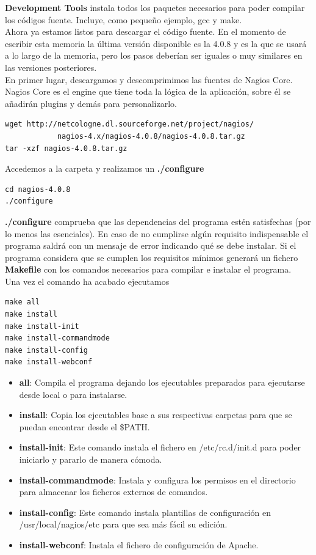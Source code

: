 \documentclass[11pt,a4paper]{article}
\begin{document}
\textbf{Development Tools} instala todos los paquetes necesarios para poder compilar los códigos fuente. Incluye, como pequeño ejemplo, gcc y make.
\\

Ahora ya estamos listos para descargar el código fuente. En el momento de escribir esta memoria la última versión disponible es la 4.0.8 y es la que se usará a lo largo de la memoria, pero los pasos deberían ser iguales o muy similares en las versiones posteriores.
\\

En primer lugar, descargamos y descomprimimos las fuentes de Nagios Core. Nagios Core es el engine que tiene toda la lógica de la aplicación, sobre él se añadirán plugins y demás para personalizarlo.

\begin{verbatim}
wget http://netcologne.dl.sourceforge.net/project/nagios/
            nagios-4.x/nagios-4.0.8/nagios-4.0.8.tar.gz
tar -xzf nagios-4.0.8.tar.gz
\end{verbatim}

Accedemos a la carpeta y realizamos un \textbf{./configure}

\begin{verbatim}
cd nagios-4.0.8
./configure
\end{verbatim}

\textbf{./configure} comprueba que las dependencias del programa estén satisfechas (por lo menos las esenciales). En caso de no cumplirse algún requisito indispensable el programa saldrá con un mensaje de error indicando qué se debe instalar. Si el programa considera que se cumplen los requisitos mínimos generará un fichero \textbf{Makefile} con los comandos necesarios para compilar e instalar el programa.
\\

Una vez el comando ha acabado ejecutamos

\begin{verbatim}
make all
make install
make install-init
make install-commandmode
make install-config
make install-webconf
\end{verbatim}

\begin{itemize}
\item \textbf{all}: Compila el programa dejando los ejecutables preparados para ejecutarse desde local o para instalarse.
\item \textbf{install}: Copia los ejecutables base a sus respectivas carpetas para que se puedan encontrar desde el \$PATH.
\item \textbf{install-init}: Este comando instala el fichero en /etc/rc.d/init.d para poder iniciarlo y pararlo de manera cómoda.
\item \textbf{install-commandmode}: Instala y configura los permisos en el directorio para almacenar los ficheros externos de comandos.
\item \textbf{install-config}: Este comando instala plantillas de configuración en /usr/local/nagios/etc para que sea más fácil su edición.
\item \textbf{install-webconf}: Instala el fichero de configuración de Apache.
\end{itemize}
\end{document}
